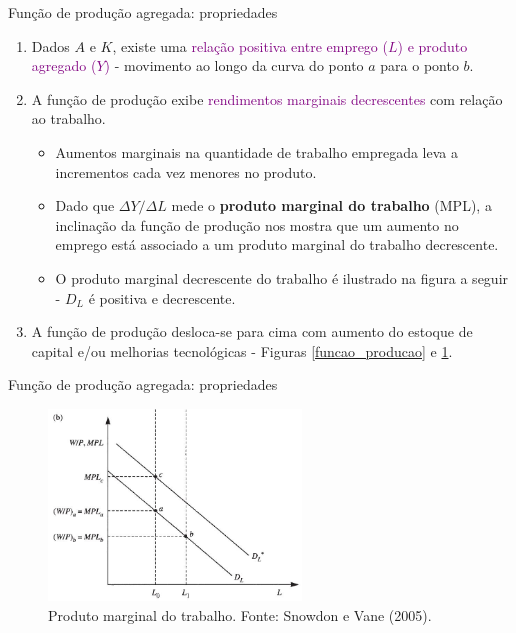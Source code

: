 \documentclass[10pt]{beamer}
\begin{document}
\begin{frame}{Função de produção agregada: propriedades}
    \begin{enumerate}
        \item Dados $A$ e $K$, existe uma \textcolor{purple}{relação positiva entre emprego ($L$) e produto agregado ($Y$)} - movimento ao longo da curva do ponto $a$ para o ponto $b$.\bigskip

        \item A função de produção exibe \textcolor{purple}{rendimentos marginais decrescentes} com relação ao trabalho.\bigskip

              \begin{itemize}
                  \item Aumentos marginais na quantidade de trabalho empregada leva a incrementos cada vez menores no produto.\medskip

                  \item Dado que $\Delta Y/\Delta L$ mede o \textbf{produto marginal do trabalho} (MPL), a inclinação da função de produção nos mostra que um aumento no emprego está associado a um produto marginal do trabalho decrescente. \medskip

                  \item O produto marginal decrescente do trabalho é ilustrado na figura a seguir - $D_L$ é positiva e decrescente.\medskip
              \end{itemize}

        \item A função de produção desloca-se para cima com aumento do estoque de capital e/ou melhorias tecnológicas - Figuras \ref{funcao_producao} e \ref{pml}.
    \end{enumerate}
\end{frame}

\begin{frame}{Função de produção agregada: propriedades}
    \begin{figure}
        \centering
        \includegraphics[width=0.6\textwidth]{./figures/aula02_pml.JPG}
        \caption{Produto marginal do trabalho. Fonte: Snowdon e Vane (2005).}
        \label{pml}
    \end{figure}
\end{frame}
\end{document}
